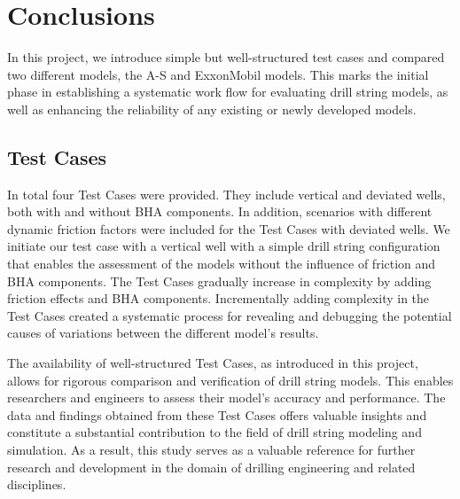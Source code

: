 \section{Conclusions}
In this project, we introduce simple but well-structured test cases and compared two different models, the A-S and ExxonMobil models. This marks the initial phase in establishing a systematic work flow for evaluating drill string models, as well as enhancing the reliability of any existing or newly developed models.

\subsection{Test Cases}
In total four Test Cases were provided. They include vertical and deviated wells, both with and without BHA components. In addition, scenarios with different dynamic friction factors were included for the Test Cases with deviated wells. We initiate our test case with a vertical well with a simple drill string configuration that enables the assessment of the models without the influence of friction and BHA components. The Test Cases gradually increase in complexity by adding friction effects and BHA components. Incrementally adding complexity in the Test Cases created a systematic process for revealing and debugging the potential causes of variations between the different model's results.

The availability of well-structured Test Cases, as introduced in this project, allows for rigorous comparison and verification of drill string models. This enables researchers and engineers to assess their model's accuracy and performance. The data and findings obtained from these Test Cases offers valuable insights and constitute a substantial contribution to the field of drill string modeling and simulation. As a result, this study serves as a valuable reference for further research and development in the domain of drilling engineering and related disciplines.

